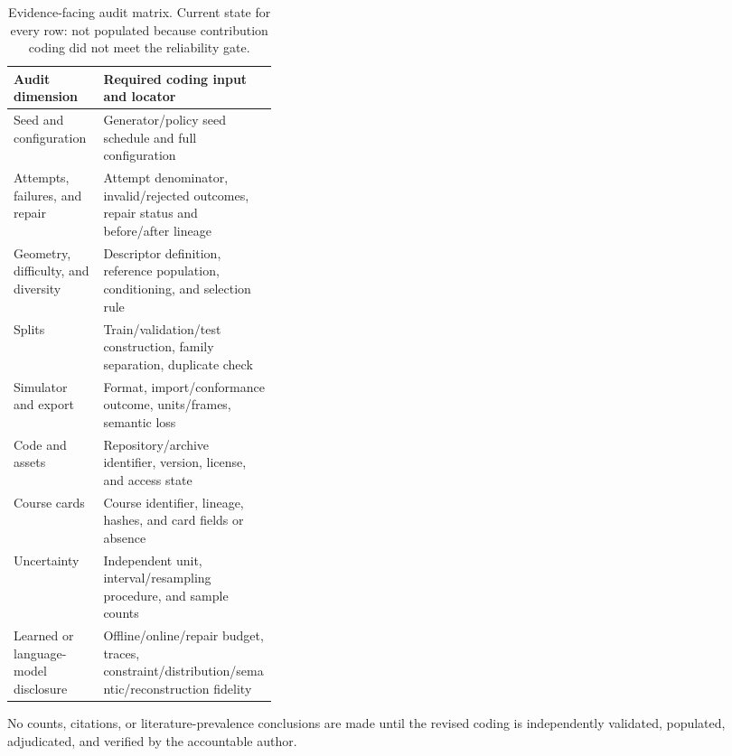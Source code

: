 \begin{table}[t]
  \centering
  \caption{Evidence-facing audit matrix. Current state for every row: not populated
  because contribution coding did not meet the reliability gate.}
  \label{tab:reporting-audit-matrix}
  \small
  \begin{tabularx}{\linewidth}{@{}p{0.34\linewidth}Y@{}}
    \toprule
    Audit dimension & Required coding input and locator \\
    \midrule
    Seed and configuration & Generator/policy seed schedule and full configuration \\
    Attempts, failures, and repair & Attempt denominator, invalid/rejected outcomes,
    repair status and before/after lineage \\
    Geometry, difficulty, and diversity & Descriptor definition, reference population,
    conditioning, and selection rule \\
    Splits & Train/validation/test construction, family separation, duplicate check \\
    Simulator and export & Format, import/conformance outcome, units/frames, semantic loss \\
    Code and assets & Repository/archive identifier, version, license, and access state \\
    Course cards & Course identifier, lineage, hashes, and card fields or absence \\
    Uncertainty & Independent unit, interval/resampling procedure, and sample counts \\
    Learned or language-model disclosure & Offline/online/repair budget, traces,
    constraint/distribution/semantic/reconstruction fidelity \\
    \bottomrule
  \end{tabularx}
\end{table}

No counts, citations, or literature-prevalence conclusions are made until the revised
coding is independently validated, populated, adjudicated, and verified by the
accountable author.
